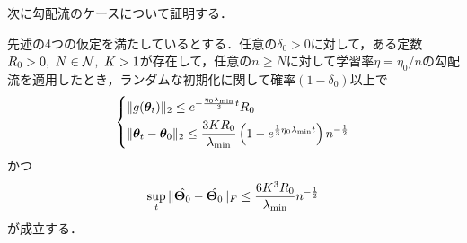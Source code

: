 次に勾配流のケースについて証明する．
\begin{thm}[勾配流]
    先述の4つの仮定を満たしているとする．任意の$\delta_0 > 0$に対して，ある定数$R_0 > 0, \ N \in \mathcal{N}, \ K > 1$が存在して，任意の$n \geq N$に対して学習率$\eta = \eta_0 / n$の勾配流を適用したとき，ランダムな初期化に関して確率$(1- \delta_0)$以上で
    \begin{align}
        \label{eq:a4_1}
        \begin{dcases}
            \|g(\bm{\theta}_t)\|_2 \leq e^{- \frac{\eta_0 \lambda_{\min}}{3}t} R_0 \\
            \|\bm{\theta}_t - \bm{\theta}_0\|_2 \leq \dfrac{3KR_0}{\lambda_{\min}} \left(1 - e^{\frac{1}{3}\eta_0 \lambda_{\min}t}\right)n^{-\frac{1}{2}}
        \end{dcases}
    \end{align}
    かつ
    \begin{align}
        \label{eq:a4_2}
        \sup_t \|\hat{\bm{\Theta}_0} - \hat{\bm{\Theta}_0}\|_F \leq \dfrac{6K^3 R_0}{\lambda_{\min}}n^{-\frac{1}{2}}
    \end{align}
    が成立する．
\end{thm}
